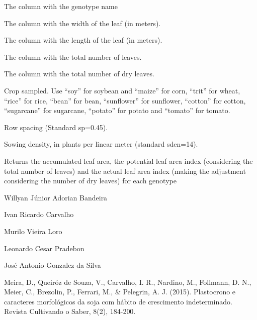 \documentclass[a4paper]{book}
\begin{document}
\begin{Arguments}
\begin{ldescription}
\item[\code{GEN}] The column with the genotype name

\item[\code{W}] The column with the width of the leaf (in meters).

\item[\code{L}] The column with the length of the leaf (in meters).

\item[\code{TNL}] The column with the total number of leaves.

\item[\code{TDL}] The column with the total number of dry leaves.

\item[\code{crop}] Crop sampled. Use “soy” for soybean and “maize” for corn, “trit”
for wheat, “rice” for rice, “bean” for bean, “sunflower” for sunflower,
“cotton” for cotton, “sugarcane” for sugarcane, “potato” for potato and
“tomato” for tomato.

\item[\code{sp}] Row spacing (Standard sp=0.45).

\item[\code{sden}] Sowing density, in plants per linear meter (standard sden=14).
\end{ldescription}
\end{Arguments}
%
\begin{Value}
Returns the accumulated leaf area, the potential leaf area index
(considering the total number of leaves) and the actual leaf area index
(making the adjustment considering the number of dry leaves) for each genotype
\end{Value}
%
\begin{Author}
Willyan Júnior Adorian Bandeira

Ivan Ricardo Carvalho

Murilo Vieira Loro

Leonardo Cesar Pradebon

José Antonio Gonzalez da Silva
\end{Author}
%
\begin{References}
Meira, D., Queiróz de Souza, V., Carvalho, I. R., Nardino, M., Follmann,
D. N., Meier, C., Brezolin, P., Ferrari, M., \& Pelegrin, A. J. (2015).
Plastocrono e caracteres morfológicos da soja com hábito de crescimento
indeterminado. Revista Cultivando o Saber, 8(2), 184-200.
\end{References}
\end{document}
